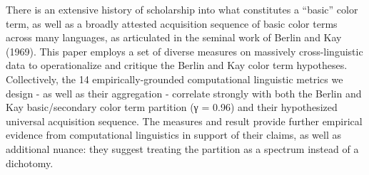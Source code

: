 There is an extensive history of scholarship into what constitutes a ``basic'' color term, as well as a broadly attested acquisition sequence of basic color terms across many languages, as articulated in the seminal work of Berlin and Kay (1969). This paper employs a set of diverse measures on massively cross-linguistic data to operationalize and critique the Berlin and Kay color term hypotheses. Collectively, the 14 empirically-grounded computational linguistic metrics we design - as well as their aggregation - correlate strongly with both the Berlin and Kay basic/secondary color term partition (γ = 0.96) and their hypothesized universal acquisition sequence. The measures and result provide further empirical evidence from computational linguistics in support of their claims, as well as additional nuance: they suggest treating the partition as a spectrum instead of a dichotomy.